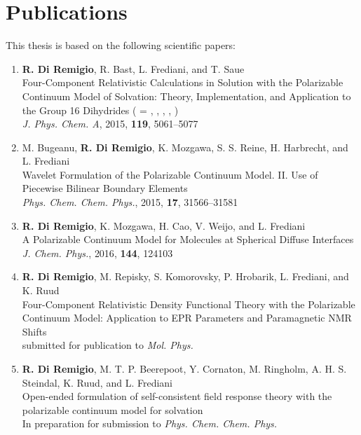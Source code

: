 \thispagestyle{empty}
\chapter*{Publications}

This thesis is based on the following scientific papers:

\begin{enumerate}[label=\textbf{\Roman{*} },ref=\Roman{*}]

\item
  \textbf{R. Di Remigio}, R. Bast, L. Frediani, and T. Saue
  \\
  Four-Component Relativistic Calculations in Solution with the
  Polarizable Continuum Model of Solvation: Theory,
  Implementation, and Application to the Group 16 Dihydrides
   ( = , , , ,
  )
  \\
\textit{J. Phys. Chem. A}, \textrm{2015}, \textbf{119}, 5061--5077
\label{relapcm}

\item
  M. Bugeanu, \textbf{R. Di Remigio}, K. Mozgawa, S. S. Reine, H.
  Harbrecht,  and L. Frediani
  \\
  Wavelet Formulation of the Polarizable Continuum Model. II. Use of
  Piecewise Bilinear Boundary Elements
  \\
  \textit{Phys. Chem. Chem. Phys.}, \textrm{2015}, \textbf{17},
  31566--31581
\label{wemlin}

\item
  \textbf{R. Di Remigio}, K. Mozgawa, H. Cao, V. Weijo, and L.
  Frediani
  \\
  A Polarizable Continuum Model for Molecules at Spherical
  Diffuse Interfaces
  \\
  \textit{J. Chem. Phys.}, \textrm{2016}, \textbf{144}, 124103
\label{spherical}

\item
  \textbf{R. Di Remigio}, M. Repisky, S. Komorovsky, P. Hrobarik, L.
  Frediani, and K. Ruud
  \\
  Four-Component Relativistic Density Functional Theory with the
  Polarizable Continuum Model: Application to EPR Parameters
  and Paramagnetic NMR Shifts
  \\
  submitted for publication to \textit{Mol. Phys.}
\label{pcmepr}

\item
  \textbf{R. Di Remigio}, M. T. P. Beerepoot, Y. Cornaton, M. Ringholm,
  A. H. S. Steindal, K. Ruud, and L. Frediani
  \\
  Open-ended formulation of self-consistent field response theory with
  the polarizable continuum model for solvation
  \\
  In preparation for submission to \textit{Phys. Chem. Chem. Phys.}
\label{pcmopenrsp}
\end{enumerate}

